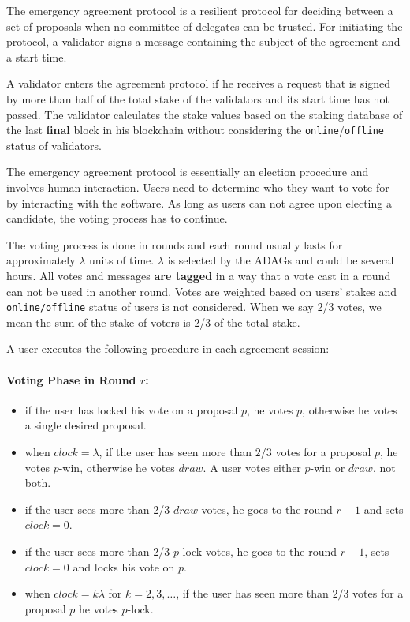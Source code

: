 The emergency agreement protocol is a resilient protocol for deciding between a set of proposals when no committee of
delegates can be trusted. For initiating the protocol, a validator signs a message containing the subject
of the agreement and a start time.

A validator enters the agreement protocol if he
receives a request that is signed by more than half of the total stake
of the validators and its start time has not passed. The validator calculates
the stake values based on the staking database of the last \textbf{final} block in his blockchain without
considering the \texttt{online}/\texttt{offline} status of validators.

The emergency agreement protocol is essentially an election procedure and involves human interaction. Users need to
determine who they want to vote for by interacting with the software. As long as users can not agree upon electing a
candidate, the voting process has to continue.

The voting process is done in rounds and each round usually lasts for approximately $\lambda$ units of time.
$\lambda$ is selected by the ADAGs and could be several hours. All votes and messages \textbf{are tagged} in a way
that a vote cast in a round can not be used in another round. Votes are weighted based on users' stakes and
\texttt{online/offline} status of users is not considered. When we say 2/3 votes, we mean the sum of the stake of
voters is 2/3 of the total stake.

A user executes the following procedure in each agreement session:
\paragraph{Voting Phase in Round $r$:}
\begin{itemize}
    \item if the user has locked his vote on a proposal $p$, he votes $p$, otherwise he votes a single desired
    proposal.
    \item when $clock = \lambda$, if the user has seen more than $2/3$ votes for a proposal $p$, he votes $p$-win,
    otherwise he votes $draw$. A user votes either $p$-win or $draw$, not both.
    \item if the user sees more than 2/3 $draw$ votes, he goes to the round $r+1$ and sets $clock=0$.
    \item if the user sees more than 2/3 $p$-lock votes, he goes to the round $r+1$, sets $clock=0$ and locks his
    vote on $p$.
    \item when $clock = k \lambda$ for $k=2,3,\dots$, if the user has seen more than $2/3$ votes for a proposal
    $p$ he votes $p$-lock.
\end{itemize}

